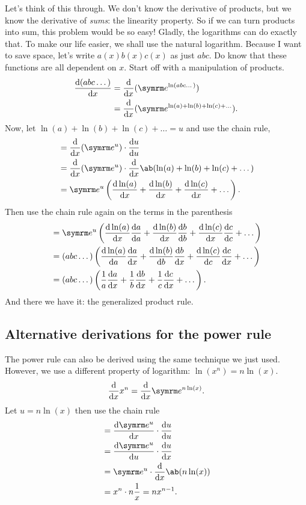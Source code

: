 Let's think of this through. We don't know the derivative of products, but we know the derivative of \emph{sums}: the linearity property. So if we can turn products into sum, this problem would be so easy! Gladly, the logarithms can do exactly that. To make our life easier, we shall use the natural logarithm. Because I want to save space, let's write $a(x)b(x)c(x)$ as just $abc$. Do know that these functions are all dependent on $x$. Start off with a manipulation of products.
\begin{align*}
    \odv{(abc\dots)}{x} &= \odv*{(\e^{\ln(abc\dots)})}{x} \\
    &= \odv*{(\e^{\ln(a) + \ln(b) + \ln(c) + \dots})}{x}.
\end{align*}
Now, let $\ln(a) + \ln(b) + \ln(c) + \dots = u$ and use the chain rule,
\begin{align*}
    &= \odv*{(\e^u)}{x} \cdot \odv{u}{u} \\
    &= \odv*{(\e^u)}{x} \cdot \odv*{\ab(\ln(a) + \ln(b) + \ln(c) + \dots)}{x} \\
    &= \e^u \left(\odv{\ln(a)}{x} + \odv{\ln(b)}{x} + \odv{\ln(c)}{x} + \dots\right).
\end{align*}
Then use the chain rule again on the terms in the parenthesis
\begin{align*}
    &= \e^u \left(\odv{\ln(a)}{x}\odv{a}{a} + \odv{\ln(b)}{x}\odv{b}{b} + \odv{\ln(c)}{x}\odv{c}{c} + \dots\right) \\
    &= (abc\dots)\left(\odv{\ln(a)}{a}\odv{a}{x} + \odv{\ln(b)}{b}\odv{b}{x} + \odv{\ln(c)}{c}\odv{c}{x} + \dots\right) \\
    &= (abc\dots)\left(\frac{1}{a}\odv{a}{x} + \frac{1}{b}\odv{b}{x} + \frac{1}{c}\odv{c}{x} + \dots\right).
\end{align*}
And there we have it: the generalized product rule.

\subsection{Alternative derivations for the power rule}

The power rule can also be derived using the same technique we just used. However, we use a different property of logarithm: $\ln(x^n) = n\ln(x)$.
\begin{equation*}
    \odv*{x^n}{x} = \odv*{\e^{n\ln(x)}}{x}.
\end{equation*}
Let $u = n\ln(x)$ then use the chain rule
\begin{align*}
    &= \odv{\e^u}{x} \cdot \odv{u}{u} \\
    &= \odv{\e^u}{u} \cdot \odv{u}{x} \\
    &= \e^u \cdot \odv*{\ab(n\ln(x))}{x} \\
    &= x^n \cdot n\frac{1}{x} = nx^{n - 1}.
\end{align*}

